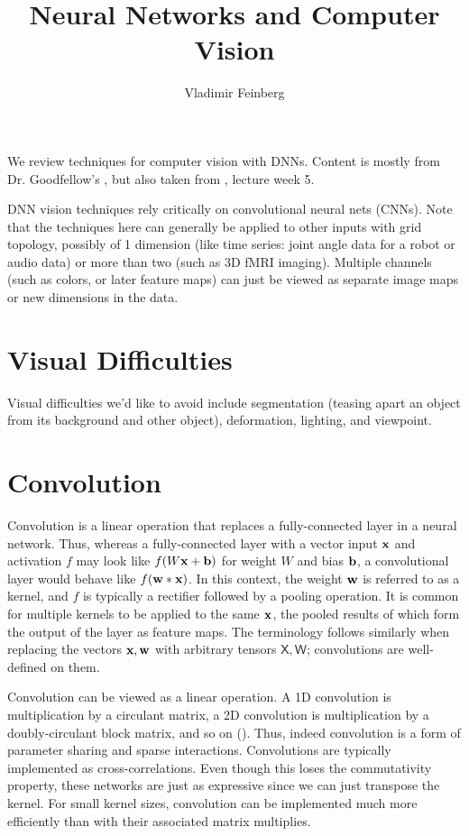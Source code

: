 \documentclass{article}
\title{Neural Networks and Computer Vision}
\author{Vladimir Feinberg}
\begin{document}
\maketitle

We review techniques for computer vision with DNNs. Content is mostly from Dr. Goodfellow's , but also taken from , lecture week 5.

DNN vision techniques rely critically on convolutional neural nets (CNNs). Note that the techniques here can generally be applied to other inputs with grid topology, possibly of 1 dimension (like time series: joint angle data for a robot or audio data) or more than two (such as 3D fMRI imaging). Multiple channels (such as colors, or later feature maps) can just be viewed as separate image maps or new dimensions in the data.

\section{Visual Difficulties}

Visual difficulties we'd like to avoid include segmentation (teasing apart an object from its background and other object), deformation, lighting, and viewpoint.

\section{Convolution}

Convolution is a linear operation that replaces a fully-connected layer in a neural network. Thus, whereas a fully-connected layer with a vector input $\textbf{x}$ and activation $f$ may look like $f(W\textbf{x}+\textbf{b})$ for weight $W$ and bias $\textbf{b}$, a convolutional layer would behave like $f(\textbf{w} *\textbf{x})$. In this context, the weight $\textbf{w}$ is referred to as a kernel, and $f$ is typically a rectifier followed by a pooling operation. It is common for multiple kernels to be applied to the same $\textbf{x}$, the pooled results of which form the output of the layer as feature maps. The terminology follows similarly when replacing the vectors $\textbf{x},\textbf{w}$ with arbitrary tensors $\mathsf{X},\mathsf{W}$; convolutions are well-defined on them.

Convolution can be viewed as a linear operation. A 1D convolution is multiplication by a circulant matrix, a 2D convolution is multiplication by a doubly-circulant block matrix, and so on (). Thus, indeed convolution is a form of parameter sharing and sparse interactions. Convolutions are typically implemented as cross-correlations. Even though this loses the commutativity property, these networks are just as expressive since we can just transpose the kernel. For small kernel sizes, convolution can be implemented much more efficiently than with their associated matrix multiplies.
\end{document}
